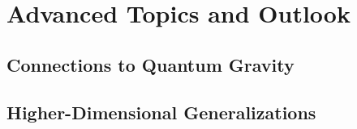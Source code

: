\section{Advanced Topics and Outlook}
\subsection{Connections to Quantum Gravity} %
\subsection{Higher-Dimensional Generalizations} %
